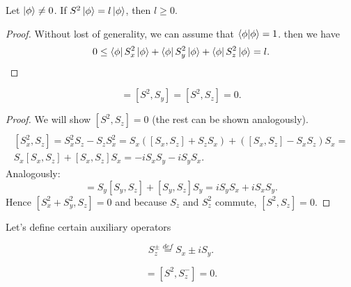 \documentclass[main.tex]{subfiles}
\begin{document}
\begin{proposition}
Let $\ket{\phi}\not = 0$. If $S^2\ket{\phi} = l\ket{\phi}$, then $l \geq 0$.
\end{proposition}
\begin{proof}
Without lost of generality, we can assume that $\bra{\phi}\ket{\phi} = 1$.
then we have
\begin{equation}
0 \leq \bra{\phi}S^2_x\ket{\phi} + \bra{\phi}S^2_y\ket{\phi} + \bra{\phi}S^2_z\ket{\phi} = l.
\end{equation}
\end{proof}

\begin{proposition}
\begin{equation}
[S^2, S_x] = [S^2, S_y] = [S^2, S_z] = 0. 
\end{equation}
\end{proposition}
\begin{proof}
We will show $[S^2, S_z] = 0$ (the rest can be shown analogously).
\begin{multline*}
\\
[S_x^2, S_z] =
S_x^2 S_z - S_z S^2_x = S_x([S_x, S_z] + S_z S_x) + ([S_x, S_z] - S_x S_z)S_x = \\
S_x[S_x, S_z] + [S_x, S_z]S_x = -iS_x S_y - i S_y S_x.
\end{multline*}
Analogously:
\begin{equation}
[S_y^2, S_z] =
S_y[S_y, S_z] + [S_y, S_z]S_y = iS_y S_x + i S_x S_y.
\end{equation}
Hence $[S_x^2 + S_y^2, S_z] = 0$ and because $S_z$ and $S^2_z$ commute, $[S^2, S_z] = 0$.

\end{proof}

Let's define certain auxiliary operators

\begin{definition}
\begin{equation}
S_z^\pm  \stackrel{def}{=} S_x \pm iS_y.
\end{equation}
\end{definition}

\begin{corollary}
\begin{equation}
[S^2, S^{+}_z] = [S^2, S^{-}_z] = 0.
\end{equation}
\end{corollary}
\end{document}
